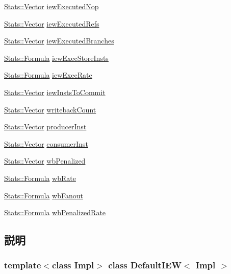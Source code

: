 \begin{DoxyCompactItemize}
\item 
\hyperlink{classStats_1_1Vector}{Stats::Vector} \hyperlink{classDefaultIEW_a63390d8471177b1fbca3c4352cce1e8f}{iewExecutedNop}
\item 
\hyperlink{classStats_1_1Vector}{Stats::Vector} \hyperlink{classDefaultIEW_a7fdb9d8f885ec0c7d7db3015b254c073}{iewExecutedRefs}
\item 
\hyperlink{classStats_1_1Vector}{Stats::Vector} \hyperlink{classDefaultIEW_a69db59d35af8f8904b1e176cb611fc9b}{iewExecutedBranches}
\item 
\hyperlink{classStats_1_1Formula}{Stats::Formula} \hyperlink{classDefaultIEW_a26e3fec9b7902bf996fbe1755c5bd063}{iewExecStoreInsts}
\item 
\hyperlink{classStats_1_1Formula}{Stats::Formula} \hyperlink{classDefaultIEW_a455816a7fa7ff2a5fa41cc7e7486d91b}{iewExecRate}
\item 
\hyperlink{classStats_1_1Vector}{Stats::Vector} \hyperlink{classDefaultIEW_ad02ecf3ed9ed64d465941dc4e5f402f9}{iewInstsToCommit}
\item 
\hyperlink{classStats_1_1Vector}{Stats::Vector} \hyperlink{classDefaultIEW_a85f5041a2e3375a2dc81bc0ae534aa2e}{writebackCount}
\item 
\hyperlink{classStats_1_1Vector}{Stats::Vector} \hyperlink{classDefaultIEW_a79df9c76c4c8c7da92694a4a571d44f0}{producerInst}
\item 
\hyperlink{classStats_1_1Vector}{Stats::Vector} \hyperlink{classDefaultIEW_a69b21b8b0360b93b3088bbf183fe6abf}{consumerInst}
\item 
\hyperlink{classStats_1_1Vector}{Stats::Vector} \hyperlink{classDefaultIEW_a364daa8f3a358e41aa13fac115bb5e0f}{wbPenalized}
\item 
\hyperlink{classStats_1_1Formula}{Stats::Formula} \hyperlink{classDefaultIEW_a5ab2bb9fa8eb98a735a204082a37c9db}{wbRate}
\item 
\hyperlink{classStats_1_1Formula}{Stats::Formula} \hyperlink{classDefaultIEW_a667246d811337454bc9ceccf8bbf8f1c}{wbFanout}
\item 
\hyperlink{classStats_1_1Formula}{Stats::Formula} \hyperlink{classDefaultIEW_a58a4cd085d39435e69bc1ee729422d84}{wbPenalizedRate}
\end{DoxyCompactItemize}


\subsection{説明}
\subsubsection*{template$<$class Impl$>$ class DefaultIEW$<$ Impl $>$}

